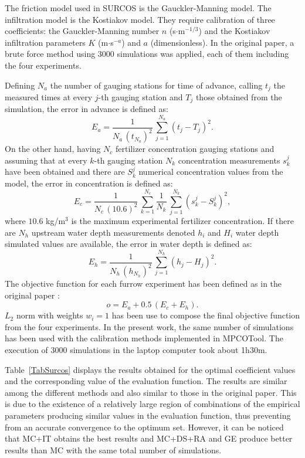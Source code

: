\documentclass[review,authoryear]{elsarticle}
\newcommand{\EQ}[2]
{\begin{equation}#1\label{#2}\end{equation}}
\newcommand{\PA}[1]{\left(#1\right)}
\begin{document}
The friction model used in SURCOS is the Gauckler-Manning model. The infiltration model is the Kostiakov model. They require calibration of three coefficients: the Gauckler-Manning number $n$ (s$\cdot$m$^{-1/3}$) and the Kostiakov infiltration parameters $K$ (m$\cdot$s$^{-a}$) and $a$ (dimensionless). In the original paper, a brute force method using 3000 simulations was applied, each of them including the four experiments.

Defining $N_a$ the number of gauging stations for time of advance, calling
$t_j$ the measured times at every $j$-th gauging station and $T_j$ those
obtained from the simulation, the error in advance is defined as:
\EQ{E_a=\frac{1}{N_a\,\PA{t_{N_a}}^2}\,\sum_{j=1}^{N_a}\PA{t_j-T_j}^2.}
{EqSurcosErrorAdvance}
On the other hand, having $N_c$ fertilizer concentration gauging stations and
assuming that at every $k$-th gauging station $N_k$ concentration measurements
$s_k^j$ have been obtained and there are $S_k^j$ numerical concentration values
from the model, the error in concentration is defined as:
\EQ
{
	E_c=\frac{1}{N_c\,(10.6)^2}\,\sum_{k=1}^{N_c}\frac{1}{N_k}\,
	\sum_{j=1}^{N_k}\PA{s_k^j-S_k^j}^2,
}{EqSurcosErrorConcentration}
where $10.6$ kg/m$^3$ is the maximum experimental fertilizer concentration. If
there are $N_h$ upstream water depth measurements denoted $h_i$ and $H_i$ water
depth simulated values are available, the error in water depth is defined as:
\EQ{E_h=\frac{1}{N_h\,\PA{h_{N_h}}^2}\,\sum_{j=1}^{N_h}\PA{h_j-H_j}^2.}
{EqErrorDepth}
The objective function for each furrow experiment has been defined as in the
original paper \citep{JaviSurcos2}:
\EQ{o=E_a+0.5\,\PA{E_c+E_h}.}{EqSurcosObjective}
$L_2$ norm with weights $w_i=1$ has been use to compose the final objective function from the four experiments. In the present work, the same number of simulations has been used with the calibration methods implemented in MPCOTool. The execution of 3000 simulations in the laptop computer took about 1h30m.

Table~\ref{TabSurcos} displays the results obtained for the optimal coefficient values and the corresponding
value of the evaluation function. The results are similar among the different methods and also similar to those in the original paper. This is due to the existence of a relatively large region of combinations of the empirical parameters producing similar values in the evaluation function, thus preventing from an accurate convergence to the optimum set. However, it can be noticed that MC+IT obtains the best results and MC+DS+RA and GE produce better results than MC with the same total number of simulations.
\end{document}
